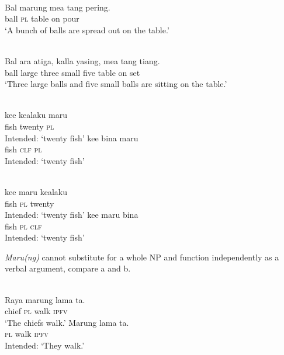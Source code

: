 \ea%
\label{ex:9:15}
 \\
\gll  Bal  marung mea tang pering. \\
 ball \textsc{pl} table on pour   \\
\glt `A bunch of balls are spread out on the table.'
\z


\ea %
\label{ex:9:16}
 \\
\gll Bal ara atiga, kalla yasing, mea tang {ti}{{\textglotstop}}{ang.} \\
 ball large three small five table on  set \\
\glt `Three large balls and five small balls are sitting on the table.'
\z



\ea%
\label{ex:9:17}
 \\
\ea
\gll *ke{\textglotstop}e kealaku maru \\
   fish  twenty \textsc{pl} \\
\glt Intended: \textsc{`}twenty fish'
\ex
\gll *ke{\textglotstop}e bina maru \\
 fish \textsc{clf} \textsc{pl} \\
\glt Intended: `twenty fish'
\z
\z


\ea%
\label{ex:9:18}
 \\
\ea
\gll *ke{\textglotstop}e  maru kealaku \\
   fish  \textsc{pl} twenty \\
\glt Intended: `twenty fish'
\ex 
\gll *ke{\textglotstop}e maru  bina \\
 fish \textsc{pl} \textsc{clf} \\
 \glt Intended: `twenty fish'
\z
\z

\textit{Maru(ng)} cannot substitute for a whole NP and function independently as a verbal argument, compare a and b.


\ea%
\label{ex:9:19}
 \\
\ea
\gll  Raya marung lama ta. \\
   chief \textsc{pl} walk \textsc{ipfv}  \\
\glt `The chiefs walk.'
\ex
\gll *Marung lama ta. \\
  \textsc{pl} walk \textsc{ipfv}  \\
\glt Intended: `They walk.'
\z
\z


